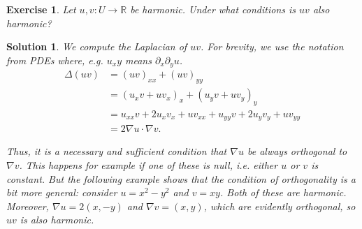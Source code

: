 \documentclass{article}
\newtheorem{ex}{Exercise}
\theoremstyle{nonumberplain}
\newtheorem{sol}{Solution}
\newcommand{\R}{\mathbb{R}}
\begin{document}
\begin{ex}
Let $u, v \colon U \to \R$ be harmonic. Under what conditions is $uv$ also harmonic?
\end{ex}

\begin{sol}
We compute the Laplacian of $uv$. For brevity, we use the notation from PDEs where, e.g. $u_xy$ means $\partial_x \partial_y u$.
\begin{equation}
\begin{aligned}
\Delta(uv) &= (uv)_{xx} + (uv)_{yy}\\
&= ( u_x v + u v_x)_x + (u_y v + u v_y)_y\\
&= u_{xx} v + 2 u_x v_x  + u v_{xx} + u_{yy} v + 2 u_y v_y + u v_{yy}\\
&= 2 \nabla u \cdot \nabla v.
\end{aligned}
\end{equation}

Thus, it is a necessary and sufficient condition that $\nabla u$ be always orthogonal to $\nabla v$. This happens for example if one of these is null, i.e. either $u$ or $v$ is constant. But the following example shows that the condition of orthogonality is a bit more general: consider $u = x^2 - y^2$ and $v = xy$. Both of these are harmonic. Moreover, $\nabla u = 2 (x,-y)$ and $\nabla v = (x,y)$, which are evidently orthogonal, so $uv$ is also harmonic.
\end{sol}
\end{document}
